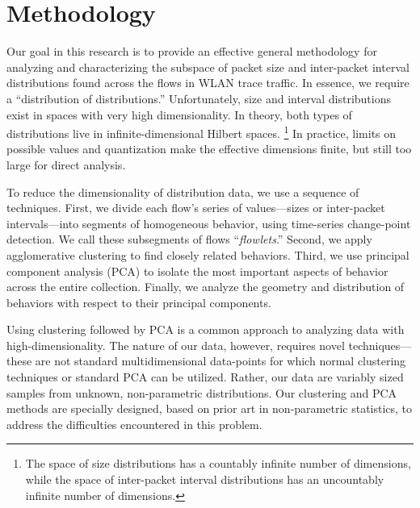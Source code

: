 \documentclass[conference]{IEEEtran}
\newcommand{\caps}[1]{{\small{#1}}}
\begin{document}
\section{Methodology}\label{sec:methodology}

Our goal in this research is to provide an effective general methodology for analyzing and characterizing the subspace of packet size and inter-packet interval distributions found across the flows in \caps{WLAN} trace traffic. In essence, we require a ``distribution of distributions.'' %
Unfortunately, size and interval distributions exist in spaces with very high dimensionality. In theory, both types of distributions live in infinite-dimensional Hilbert spaces.%
\footnote{The space of size distributions has a countably infinite number of dimensions, while the space of inter-packet interval distributions has an uncountably infinite number of dimensions.}
In practice, limits on possible values and quantization make the effective dimensions finite, but still too large for direct analysis.%

To reduce the dimensionality of distribution data, we use a sequence of techniques.
First, we divide each flow's series of values---sizes or inter-packet intervals---into segments of homogeneous behavior, using time-series change-point detection. We call these subsegments of flows ``\textit{flowlets}.'' Second, we apply agglomerative clustering to find closely related behaviors. Third, we use principal component analysis (\caps{PCA}) to isolate the most important aspects of behavior across the entire collection. Finally, we analyze the geometry and distribution of behaviors with respect to their principal components.

Using clustering followed by \caps{PCA} is a common approach to analyzing data with high-dimensionality. %
The nature of our data, however, requires novel techniques---these are not standard multidimensional data-points for which normal clustering techniques or standard \caps{PCA} can be utilized. Rather, our data are variably sized samples from unknown, non-parametric distributions. Our clustering and \caps{PCA} methods are specially designed, based on prior art in non-parametric statistics, to address the difficulties encountered in this problem.
\end{document}
